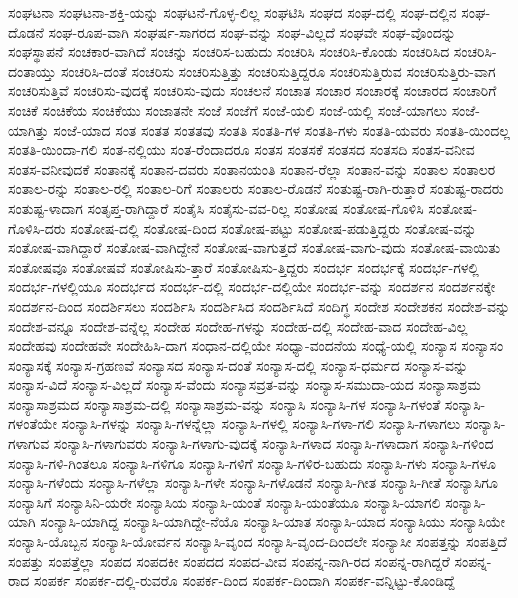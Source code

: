 {ಸಂಘಟನಾ
ಸಂಘಟನಾ-ಶಕ್ತಿ-ಯನ್ನು
ಸಂಘಟನೆ-ಗೊಳ್ಳ-ಲಿಲ್ಲ
ಸಂಘಟಿಸಿ
ಸಂಘದ
ಸಂಘ-ದಲ್ಲಿ
ಸಂಘ-ದಲ್ಲಿನ
ಸಂಘ-ದೊಡನೆ
ಸಂಘ-ರೂಪ-ವಾಗಿ
ಸಂಘರ್ಷ-ಸಾಗರದ
ಸಂಘ-ವನ್ನು
ಸಂಘ-ವಿಲ್ಲದೆ
ಸಂಘವೇ
ಸಂಘ-ವೊಂದನ್ನು
ಸಂಘಸ್ಥಾಪನೆ
ಸಂಚಕಾರ-ವಾಗಿದೆ
ಸಂಚನ್ನು
ಸಂಚರಿಸ-ಬಹುದು
ಸಂಚರಿಸಿ
ಸಂಚರಿಸಿ-ಕೊಂಡು
ಸಂಚರಿಸಿದ
ಸಂಚರಿಸಿ-ದಂತಾಯ್ತು
ಸಂಚರಿಸಿ-ದಂತೆ
ಸಂಚರಿಸು
ಸಂಚರಿಸುತ್ತಿತ್ತು
ಸಂಚರಿಸುತ್ತಿದ್ದರೂ
ಸಂಚರಿಸುತ್ತಿರುವ
ಸಂಚರಿಸುತ್ತಿರು-ವಾಗ
ಸಂಚರಿಸುತ್ತಿವೆ
ಸಂಚರಿಸು-ವುದಕ್ಕೆ
ಸಂಚರಿಸು-ವುದು
ಸಂಚಲನೆ
ಸಂಚಾತ
ಸಂಚಾರ
ಸಂಚಾರಕ್ಕೆ
ಸಂಚಾರದ
ಸಂಚಾರಿಗೆ
ಸಂಚಿಕೆ
ಸಂಚಿಕೆಯ
ಸಂಚಿಕೆಯು
ಸಂಜಾತನೇ
ಸಂಜೆ
ಸಂಜೆಗೆ
ಸಂಜೆ-ಯಲಿ
ಸಂಜೆ-ಯಲ್ಲಿ
ಸಂಜೆ-ಯಾಗಲು
ಸಂಜೆ-ಯಾಗಿತ್ತು
ಸಂಜೆ-ಯಾದ
ಸಂತ
ಸಂತತ
ಸಂತತವು
ಸಂತತಿ
ಸಂತತಿ-ಗಳ
ಸಂತತಿ-ಗಳು
ಸಂತತಿ-ಯವರು
ಸಂತತಿ-ಯಿಂದಲ್ಲ
ಸಂತತಿ-ಯಿಂದಾ-ಗಲಿ
ಸಂತ-ನಲ್ಲಿಯು
ಸಂತ-ರೆಂದಾದರೂ
ಸಂತಸ
ಸಂತಸಕೆ
ಸಂತಸದ
ಸಂತಸದಿ
ಸಂತಸ-ವನೀವ
ಸಂತಸ-ವನೀವುದಕೆ
ಸಂತಾನಕ್ಕೆ
ಸಂತಾನ-ದವರು
ಸಂತಾನಯಂತಿ
ಸಂತಾನ-ರೆಲ್ಲಾ
ಸಂತಾನ-ವನ್ನು
ಸಂತಾಲ
ಸಂತಾಲರ
ಸಂತಾಲ-ರನ್ನು
ಸಂತಾಲ-ರಲ್ಲಿ
ಸಂತಾಲ-ರಿಗೆ
ಸಂತಾಲರು
ಸಂತಾಲ-ರೊಡನೆ
ಸಂತುಷ್ಟ-ರಾಗಿ-ರುತ್ತಾರೆ
ಸಂತುಷ್ಟ-ರಾದರು
ಸಂತುಷ್ಟ-ಳಾದಾಗ
ಸಂತೃಪ್ತ-ರಾಗಿದ್ದಾರೆ
ಸಂತೈಸಿ
ಸಂತೈಸು-ವವ-ರಿಲ್ಲ
ಸಂತೋಷ
ಸಂತೋಷ-ಗೊಳಿಸಿ
ಸಂತೋಷ-ಗೊಳಿಸಿ-ದರು
ಸಂತೋಷ-ದಲ್ಲಿ
ಸಂತೋಷ-ದಿಂದ
ಸಂತೋಷ-ಪಟ್ಟು
ಸಂತೋಷ-ಪಡುತ್ತಿದ್ದರು
ಸಂತೋಷ-ವನ್ನು
ಸಂತೋಷ-ವಾಗಿದ್ದಾರೆ
ಸಂತೋಷ-ವಾಗಿದ್ದೇನೆ
ಸಂತೋಷ-ವಾಗುತ್ತದೆ
ಸಂತೋಷ-ವಾಗು-ವುದು
ಸಂತೋಷ-ವಾಯಿತು
ಸಂತೋಷವೂ
ಸಂತೋಷವೆ
ಸಂತೋಷಿಸು-ತ್ತಾರೆ
ಸಂತೋಷಿಸು-ತ್ತಿದ್ದರು
ಸಂದರ್ಭ
ಸಂದರ್ಭಕ್ಕೆ
ಸಂದರ್ಭ-ಗಳಲ್ಲಿ
ಸಂದರ್ಭ-ಗಳಲ್ಲಿಯೂ
ಸಂದರ್ಭದ
ಸಂದರ್ಭ-ದಲ್ಲಿ
ಸಂದರ್ಭ-ದಲ್ಲಿಯೇ
ಸಂದರ್ಭ-ವನ್ನು
ಸಂದರ್ಶನ
ಸಂದರ್ಶನಕ್ಕೇ
ಸಂದರ್ಶನ-ದಿಂದ
ಸಂದರ್ಶಿಸಲು
ಸಂದರ್ಶಿಸಿ
ಸಂದರ್ಶಿಸಿದ
ಸಂದರ್ಶಿಸಿದೆ
ಸಂದಿಗ್ಧ
ಸಂದೇಶ
ಸಂದೇಶಕನ
ಸಂದೇಶ-ವನ್ನು
ಸಂದೇಶ-ವನ್ನೂ
ಸಂದೇಶ-ವನ್ನೆಲ್ಲ
ಸಂದೇಹ
ಸಂದೇಹ-ಗಳನ್ನು
ಸಂದೇಹ-ದಲ್ಲಿ
ಸಂದೇಹ-ವಾದ
ಸಂದೇಹ-ವಿಲ್ಲ
ಸಂದೇಹವು
ಸಂದೇಹವೇ
ಸಂದೇಹಿಸಿ-ದಾಗ
ಸಂಧಾನ-ದಲ್ಲಿಯೇ
ಸಂಧ್ಯಾ-ವಂದನೆಯ
ಸಂಧ್ಯೆ-ಯಲ್ಲಿ
ಸಂನ್ಯಾಸ
ಸಂನ್ಯಾಸಂ
ಸಂನ್ಯಾಸಕ್ಕೆ
ಸಂನ್ಯಾಸ-ಗ್ರಹಣವೆ
ಸಂನ್ಯಾಸದ
ಸಂನ್ಯಾಸ-ದಂತೆ
ಸಂನ್ಯಾಸ-ದಲ್ಲಿ
ಸಂನ್ಯಾಸ-ಧರ್ಮದ
ಸಂನ್ಯಾಸ-ವನ್ನು
ಸಂನ್ಯಾಸ-ವಿದೆ
ಸಂನ್ಯಾಸ-ವಿಲ್ಲದೆ
ಸಂನ್ಯಾಸ-ವೆಂದು
ಸಂನ್ಯಾಸವ್ರತ-ವನ್ನು
ಸಂನ್ಯಾಸ-ಸಮುದಾ-ಯದ
ಸಂನ್ಯಾಸಾಶ್ರಮ
ಸಂನ್ಯಾಸಾಶ್ರಮದ
ಸಂನ್ಯಾಸಾಶ್ರಮ-ದಲ್ಲಿ
ಸಂನ್ಯಾಸಾಶ್ರಮ-ವನ್ನು
ಸಂನ್ಯಾಸಿ
ಸಂನ್ಯಾಸಿ-ಗಳ
ಸಂನ್ಯಾಸಿ-ಗಳಂತೆ
ಸಂನ್ಯಾಸಿ-ಗಳಂತೆಯೇ
ಸಂನ್ಯಾಸಿ-ಗಳನ್ನು
ಸಂನ್ಯಾಸಿ-ಗಳನ್ನೆಲ್ಲಾ
ಸಂನ್ಯಾಸಿ-ಗಳಲ್ಲಿ
ಸಂನ್ಯಾಸಿ-ಗಳಾ-ಗಲಿ
ಸಂನ್ಯಾಸಿ-ಗಳಾಗಲು
ಸಂನ್ಯಾಸಿ-ಗಳಾಗುವ
ಸಂನ್ಯಾಸಿ-ಗಳಾಗುವರು
ಸಂನ್ಯಾಸಿ-ಗಳಾಗು-ವುದಕ್ಕೆ
ಸಂನ್ಯಾಸಿ-ಗಳಾದ
ಸಂನ್ಯಾಸಿ-ಗಳಾದಾಗ
ಸಂನ್ಯಾಸಿ-ಗಳಿಂದ
ಸಂನ್ಯಾಸಿ-ಗಳಿ-ಗಿಂತಲೂ
ಸಂನ್ಯಾಸಿ-ಗಳಿಗೂ
ಸಂನ್ಯಾಸಿ-ಗಳಿಗೆ
ಸಂನ್ಯಾಸಿ-ಗಳಿರ-ಬಹುದು
ಸಂನ್ಯಾಸಿ-ಗಳು
ಸಂನ್ಯಾಸಿ-ಗಳೂ
ಸಂನ್ಯಾಸಿ-ಗಳೆಂದು
ಸಂನ್ಯಾಸಿ-ಗಳೆಲ್ಲಾ
ಸಂನ್ಯಾಸಿ-ಗಳೇ
ಸಂನ್ಯಾಸಿ-ಗಳೊಡನೆ
ಸಂನ್ಯಾಸಿ-ಗೀತ
ಸಂನ್ಯಾಸಿ-ಗೀತೆ
ಸಂನ್ಯಾಸಿಗೂ
ಸಂನ್ಯಾಸಿಗೆ
ಸಂನ್ಯಾಸಿನಿ-ಯರೇ
ಸಂನ್ಯಾಸಿಯ
ಸಂನ್ಯಾಸಿ-ಯಂತೆ
ಸಂನ್ಯಾಸಿ-ಯಂತೆಯೂ
ಸಂನ್ಯಾಸಿ-ಯಾಗಲಿ
ಸಂನ್ಯಾಸಿ-ಯಾಗಿ
ಸಂನ್ಯಾಸಿ-ಯಾಗಿದ್ದ
ಸಂನ್ಯಾಸಿ-ಯಾಗಿದ್ದೇ-ನೆಯೊ
ಸಂನ್ಯಾಸಿ-ಯಾತ
ಸಂನ್ಯಾಸಿ-ಯಾದ
ಸಂನ್ಯಾಸಿಯು
ಸಂನ್ಯಾಸಿಯೇ
ಸಂನ್ಯಾಸಿ-ಯೊಬ್ಬನ
ಸಂನ್ಯಾಸಿ-ಯೋರ್ವನ
ಸಂನ್ಯಾಸಿ-ವೃಂದ
ಸಂನ್ಯಾಸಿ-ವೃಂದ-ದಿಂದಲೇ
ಸಂನ್ಯಾಸೀ
ಸಂಪತ್ತನ್ನು
ಸಂಪತ್ತಿದೆ
ಸಂಪತ್ತು
ಸಂಪತ್ತೆಲ್ಲಾ
ಸಂಪದ
ಸಂಪದಕೀ
ಸಂಪದದ
ಸಂಪದ-ವೀವ
ಸಂಪನ್ನ-ನಾಗಿ-ರದ
ಸಂಪನ್ನ-ರಾಗಿದ್ದರೆ
ಸಂಪನ್ನ-ರಾದ
ಸಂಪರ್ಕ
ಸಂಪರ್ಕ-ದಲ್ಲಿ-ರುವರೊ
ಸಂಪರ್ಕ-ದಿಂದ
ಸಂಪರ್ಕ-ದಿಂದಾಗಿ
ಸಂಪರ್ಕ-ವನ್ನಿಟ್ಟು-ಕೊಂಡಿದ್ದೆ
}
